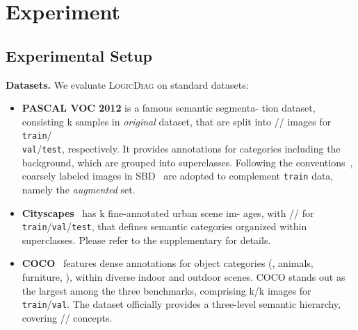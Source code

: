 \documentclass[10pt,twocolumn,letterpaper]{article}
\def\Ours{{\textsc{LogicDiag}}}
\begin{document}
\section{Experiment}\label{sec:exp}

\subsection{Experimental Setup}
\noindent\textbf{Datasets.} We evaluate {\Ours} on standard datasets:
\begin{itemize}[leftmargin=*]
   \setlength{\topsep}{0pt}
   \setlength{\itemsep}{0pt}
   \setlength{\parsep}{0pt}
   \setlength{\parskip}{0pt}
   \setlength{\partopsep}{0pt}
   \setlength{\itemindent}{0pt}

   \item \textbf{PASCAL VOC 2012} is a famous semantic segmenta- tion dataset, consisting \app {}k samples in \textit{original} dataset, that are split into // images for \texttt{train}/\\\texttt{val}/\texttt{test}, respectively. It provides annotations for  categories including the background, which are grouped into  superclasses.
   Following the conventions~\cite{chen2021semi,wang2022semi},  coarsely labeled images in SBD~\cite{hariharan2011semantic} are adopted to complement \texttt{train} data, namely the \textit{augmented} set.

   \item \textbf{Cityscapes}~\cite{cordts2016cityscapes} has k fine-annotated urban scene im- ages, with // for \texttt{train}/\texttt{val}/\texttt{test}, that defines  semantic categories organized within  superclasses. Please refer to the supplementary for details.

   \item \textbf{COCO}~\cite{lin2014microsoft} features dense annotations for  object categories (\eg, animals, furniture, \etc), within diverse indoor and outdoor scenes. COCO stands out as the largest among the three benchmarks, comprising k/k images for \texttt{train}/\texttt{val}. The dataset officially provides a three-level semantic hierarchy, covering // concepts. 

\end{itemize}
\end{document}
